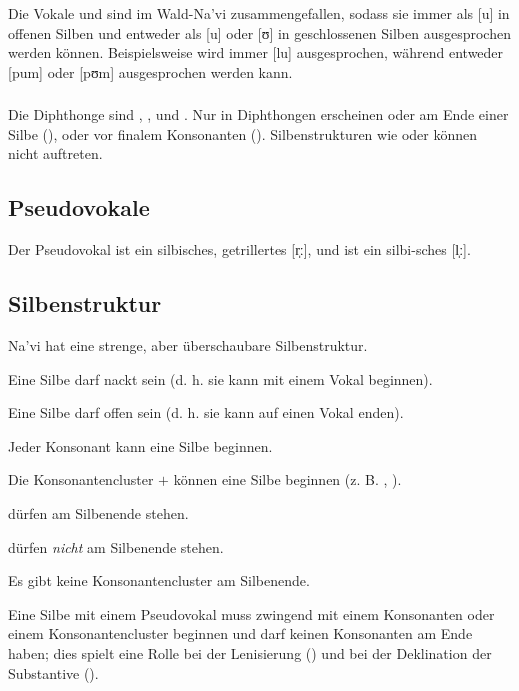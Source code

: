 \subsubsection{} Die Vokale  und  sind im Wald-Na'vi zusammengefallen, sodass sie immer als [u] in offenen Silben und entweder als [u] oder [ʊ] in geschlossenen Silben ausgesprochen werden können. Beispielsweise wird  immer [lu] ausgesprochen, während  entweder [pum] oder [pʊm] ausgesprochen werden kann.


\subsubsection{} Die Diphthonge sind , ,  und . Nur in  Diphthongen erscheinen  oder  am Ende einer Silbe (), oder vor finalem Konsonanten (). Silbenstrukturen wie  oder  können nicht auftreten.

\subsection{Pseudovokale} Der Pseudovokal  ist ein silbisches, getrillertes [r̩ː], und  ist ein silbi-sches [l̩ː].

\subsection{Silbenstruktur}
Na'vi hat eine strenge, aber überschaubare Silbenstruktur.

\begin{itemize*}
	\item Eine Silbe darf nackt sein (d. h. sie kann mit einem Vokal beginnen).
	\item Eine Silbe darf offen sein (d. h. sie kann auf einen Vokal enden).
	\item Jeder Konsonant kann eine Silbe beginnen.
	\item Die Konsonantencluster  $+$  können eine Silbe beginnen (z. B. , ).
	\item {} dürfen am Silbenende stehen.
	\item {} dürfen \textit{nicht} am Silbenende stehen.
	\item Es gibt keine Konsonantencluster am Silbenende.
	\item \label{lands:pseudo-no-null} Eine Silbe mit einem Pseudovokal muss zwingend mit einem Konsonanten oder einem Konsonantencluster beginnen und darf keinen Konsonanten am Ende haben; dies spielt eine Rolle bei der Lenisierung () und bei der Deklination der Substantive ().
\end{itemize*}

